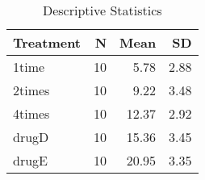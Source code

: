 \documentclass{article}
\begin{document}



\begin{table}[ht]
\centering
\begin{tabular}{lrrr}
  \hline
Treatment & N & Mean & SD \\ 
  \hline
1time &  10 & 5.78 & 2.88 \\ 
  2times &  10 & 9.22 & 3.48 \\ 
  4times &  10 & 12.37 & 2.92 \\ 
  drugD &  10 & 15.36 & 3.45 \\ 
  drugE &  10 & 20.95 & 3.35 \\ 
   \hline
\end{tabular}
\caption{Descriptive Statistics} 
\label{table:descriptives}
\end{table}
\end{document}
